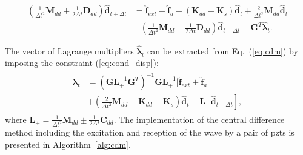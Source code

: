 \begin{equation}
	\begin{split}
		\left(\frac{1}{\Delta t^2}\textbf{M}_{dd}+\frac{1}{2\Delta t}\textbf{D}_{dd} \right)\widehat{\textbf{d}}_{t+\Delta t} & = \widehat{\textbf{f}}_{ext} + \widehat{\textbf{f}}_{a} - \left( \textbf{K}_{dd}-\textbf{K}_s\right)\widehat{\textbf{d}}_t
		+ \frac{2}{\Delta t^2}\textbf{M}_{dd}\widehat{\textbf{d}}_t\\
		&-\left(\frac{1}{\Delta t^2}\textbf{M}_{dd}-\frac{1}{2\Delta t}\textbf{D}_{dd}\right)\widehat{\textbf{d}}_{t-\Delta t}-\textbf{G}^T\widehat{\boldsymbol{\lambda}}_t.
	\end{split}
	\label{eq:cdm}
\end{equation}

The vector of Lagrange multipliers \(\widehat{\boldsymbol{\lambda}}_t\) can be extracted from Eq.~(\ref{eq:cdm}) by imposing the constraint (\ref{eq:cond_disp}): 
\begin{eqnarray}
	\begin{split}
		\widehat{\boldsymbol{\lambda}}_t & = {\left(\textbf{G}\textbf{L}_+^{-1}\textbf{G}^T 	\right)}^{-1}\textbf{G}\textbf{L}_+^{-1} \Bigg[ \widehat{\textbf{f}}_{ext} + \widehat{\textbf{f}}_{a}\\
		& + \left.\left(\frac{2}{\Delta t^2}\textbf{M}_{dd}-\textbf{K}_{dd}+\textbf{K}_s\right)\widehat{\textbf{d}}_t -\textbf{L}_-\widehat{\textbf{d}}_{t-\Delta t} \right],
	\end{split}
	\label{eq:lambda}
\end{eqnarray}
where \(\textbf{L}_{\pm}=\frac{1}{\Delta t^2}\textbf{M}_{dd}\pm\frac{1}{2\Delta t}\textbf{C}_{dd}\).
The implementation of the central difference method including the excitation and reception of the wave by a pair of \acp{pzt} is presented in Algorithm~\ref{alg:cdm}.

